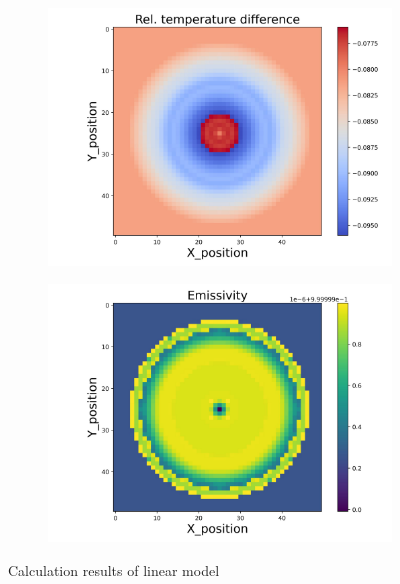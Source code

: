 \begin{figure}[htbp]
\begin{minipage}{\textwidth}
\begin{subfigure}{0.49\textwidth}
        \end{subfigure}
    \end{minipage}\\
    \begin{minipage}{\textwidth}
        \centering
        \begin{subfigure}{0.49\textwidth}
            \centering
            \includegraphics[width=\textwidth]{figures/raw_data/5/linear/T_bias.jpg}
        \end{subfigure}
        \begin{subfigure}{0.49\textwidth}
            \centering
            \includegraphics[width=\textwidth]{figures/raw_data/5/linear/emi_cal.jpg}
        \end{subfigure}
    \end{minipage}
    \caption{Calculation results of linear model}
    \label{fig: result_linear_model}
\end{figure}


